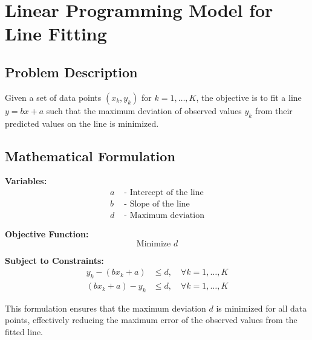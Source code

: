 \documentclass{article}
\begin{document}
\section*{Linear Programming Model for Line Fitting}

\subsection*{Problem Description}
Given a set of data points \((x_k, y_k)\) for \(k = 1, \ldots, K\), the objective is to fit a line \(y = bx + a\) such that the maximum deviation of observed values \(y_k\) from their predicted values on the line is minimized.

\subsection*{Mathematical Formulation}

\textbf{Variables:}
\begin{align*}
a & \text{ - Intercept of the line} \\
b & \text{ - Slope of the line} \\
d & \text{ - Maximum deviation}
\end{align*}

\textbf{Objective Function:}
\[ 
\text{Minimize } d 
\]

\textbf{Subject to Constraints:}
\begin{align*}
y_k - (bx_k + a) & \leq d, \quad \forall k = 1, \ldots, K \\
(bx_k + a) - y_k & \leq d, \quad \forall k = 1, \ldots, K
\end{align*}

This formulation ensures that the maximum deviation \(d\) is minimized for all data points, effectively reducing the maximum error of the observed values from the fitted line.
\end{document}
